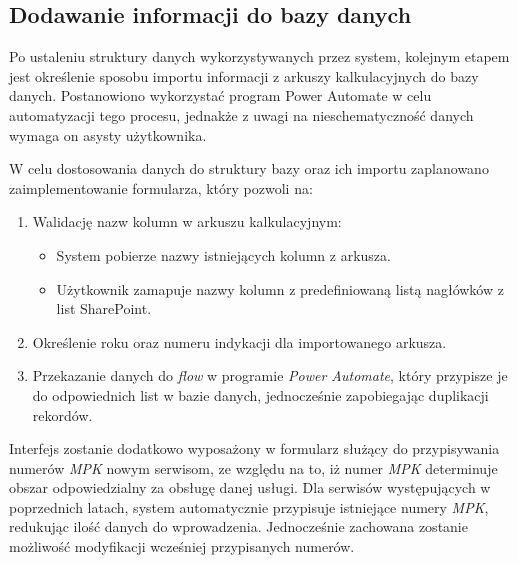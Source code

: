 \subsection{Dodawanie informacji do bazy danych}

Po ustaleniu struktury danych wykorzystywanych przez system, kolejnym etapem jest określenie sposobu importu informacji z arkuszy kalkulacyjnych do bazy danych. Postanowiono wykorzystać program Power Automate w celu automatyzacji tego procesu, jednakże z uwagi na nieschematyczność danych wymaga on asysty użytkownika.

W celu dostosowania danych do struktury bazy oraz ich importu zaplanowano zaimplementowanie formularza, który pozwoli na:
\begin{enumerate}
    \item Walidację nazw kolumn w arkuszu kalkulacyjnym:
          \begin{itemize}
              \item System pobierze nazwy istniejących kolumn z arkusza.
              \item Użytkownik zamapuje nazwy kolumn z predefiniowaną listą nagłówków z list SharePoint.
          \end{itemize}
    \item Określenie roku oraz numeru indykacji dla importowanego arkusza.
    \item Przekazanie danych do \emph{flow} w programie \emph{Power Automate}, który przypisze je do odpowiednich list w bazie danych, jednocześnie zapobiegając duplikacji rekordów.
\end{enumerate}

\begin{comment}
W celu dostosowania danych do struktury bazy, zaplanowano zaimplementowanie formularza walidacyjnego dla nazw kolumn. System pobiera nazwy istniejących kolumn z arkusza i umożliwia ich mapowanie z wykorzystaniem predefiniowanej listy nagłówków z list SharePoint.

Po uporządkowaniu struktury, użytkownik określa rok oraz numer indykacji dla importowanego arkusza. Następnie dane przekazywane są do \emph{flow} w programie \emph{Power Automate}, który przypisze je do odpowiednich list w bazie danych, jednocześnie zapobiegając duplikacji rekordów.
\end{comment}
Interfejs zostanie dodatkowo wyposażony w formularz służący do przypisywania numerów \emph{MPK} nowym serwisom, ze względu na to, iż numer \emph{MPK} determinuje obszar odpowiedzialny za obsługę danej usługi. Dla serwisów występujących w poprzednich latach, system automatycznie przypisuje istniejące numery \emph{MPK}, redukując ilość danych do wprowadzenia. Jednocześnie zachowana zostanie możliwość modyfikacji wcześniej przypisanych numerów.

